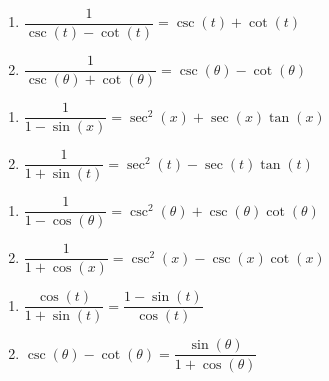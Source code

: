 \begin{multicols}{2}

\begin{enumerate}

\setcounter{enumi}{\value{HW}}

\item  $\dfrac{1}{\csc(t) - \cot(t)} = \csc(t) + \cot(t)$
\item  $\dfrac{1}{\csc(\theta) + \cot(\theta)} = \csc(\theta) - \cot(\theta)$

\setcounter{HW}{\value{enumi}}

\end{enumerate}

\end{multicols}

\begin{multicols}{2}

\begin{enumerate}

\setcounter{enumi}{\value{HW}}

\item  $\dfrac{1}{1-\sin(x)} = \sec^{2}(x) + \sec(x) \tan(x)$
\item  $\dfrac{1}{1+\sin(t)} = \sec^{2}(t) - \sec(t) \tan(t)$

\setcounter{HW}{\value{enumi}}

\end{enumerate}

\end{multicols}

\begin{multicols}{2}

\begin{enumerate}

\setcounter{enumi}{\value{HW}}

\item  $\dfrac{1}{1-\cos(\theta)} = \csc^{2}(\theta) + \csc(\theta) \cot(\theta)$
\item  $\dfrac{1}{1+\cos(x)} = \csc^{2}(x) - \csc(x) \cot(x)$

\setcounter{HW}{\value{enumi}}

\end{enumerate}

\end{multicols}

\begin{multicols}{2}

\begin{enumerate}

\setcounter{enumi}{\value{HW}}

\item $\dfrac{\cos(t)}{1 + \sin(t)} = \dfrac{1-\sin(t)}{\cos(t)}$
\item $\csc(\theta) - \cot(\theta) = \dfrac{\sin(\theta)}{1 + \cos(\theta)}$

\setcounter{HW}{\value{enumi}}

\end{enumerate}

\end{multicols}

